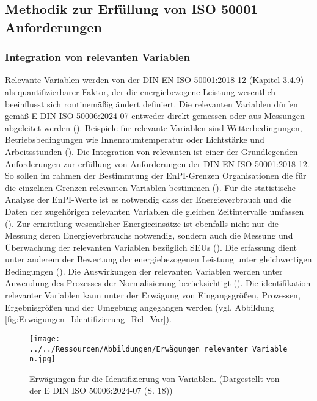 \subsection{Methodik zur Erfüllung von ISO 50001 Anforderungen}

\subsubsection{Integration von relevanten Variablen}
Relevante Variablen werden von der DIN EN ISO 50001:2018-12 (Kapitel 3.4.9) als quantifizierbarer Faktor, der die energiebezogene Leistung wesentlich beeinflusst sich 
routinemäßig ändert definiert. 
Die relevanten Variablen dürfen gemäß E DIN ISO 50006:2024-07 entweder direkt gemessen oder aus Messungen abgeleitet werden (\cite[S. 18]{DIN50006.2024}).
Beispiele für relevante Variablen sind Wetterbedingungen, Betriebsbedingungen wie Innenraumtemperatur oder Lichtstärke und Arbeitsstunden (\cite[Kapitel 3.4.9]{DIN50001.2018}).
Die Integration von relevanten ist einer der Grundlegenden Anforderungen zur erfüllung von Anforderungen der DIN EN ISO 50001:2018-12.
So sollen im rahmen der Bestimmtung der EnPI-Grenzen Organisationen die für die einzelnen Grenzen relevanten Variablen bestimmen (\cite[S. 17]{DIN50006.2024}).
Für die statistische Analyse der EnPI-Werte ist es notwendig dass der Energieverbrauch und die Daten der zugehörigen relevanten Variablen 
die gleichen Zeitintervalle umfassen (\cite[S. 20]{DIN50006.2024}).
Zur ermittlung wesentlicher Energieeinsätze ist ebenfalls nicht nur die Messung deren Energieverbrauchs notwendig, sondern auch die Messung und Überwachung der 
relevanten Variablen bezüglich SEUs (\cite[S. 23]{DIN50001.2018}). 
Die erfassung dient unter anderem der Bewertung der energiebezogenen Leistung unter gleichwertigen Bedingungen (\cite[S. 8]{DIN50006.2024}). 
Die Auswirkungen der relevanten Variablen werden unter Anwendung des Prozesses der Normalisierung berücksichtigt (\cite[S. 8]{DIN50006.2024}).
Die identifikation relevanter Variablen kann unter der Erwägung von Eingangsgrößen, Prozessen, Ergebnisgrößen und der Umgebung angegangen werden 
(vgl. Abbildung \eqref{fig:Erwägungen_Identifizierung_Rel_Var}).

\begin{figure}[H]
    \centering
    \texttt{[image: ../../Ressourcen/Abbildungen/Erwägungen\_relevanter\_Variablen.jpg]}
    \caption{Erwägungen für die Identifizierung von Variablen. (Dargestellt von der E DIN ISO 50006:2024-07 (S. 18))}
    \label{fig:Erwägungen_Identifizierung_Rel_Var}
\end{figure}



